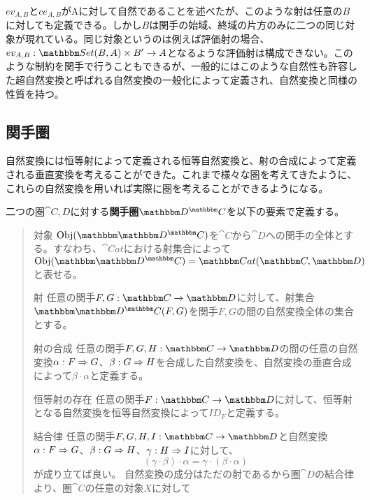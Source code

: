   $ev_{A,B}$と$ce_{A,B}$がAに対して自然であることを述べたが、このような射は任意の$B$に対しても定義できる。しかし$B$は関手の始域、終域の片方のみに二つの同じ対象が現れている。同じ対象というのは例えば評価射の場合、$\mor{ev_{A,B}}{\arset{Set}{B}{A}\times B'}{A}$となるような評価射は構成できない。このような制約を関手で行うこともできるが、一般的にはこのような自然性も許容した超自然変換と呼ばれる自然変換の一般化によって定義され、自然変換と同様の性質を持つ。
	\subsection{関手圏}
	自然変換には恒等射によって定義される恒等自然変換と、射の合成によって定義される垂直変換を考えることができた。これまで様々な圏を考えてきたように、これらの自然変換を用いれば実際に圏を考えることができるようになる。
	\begin{define}[関手圏]
		二つの圏$\cat{C,D}$に対する\textbf{関手圏}$\funccat{C}{D}$を以下の要素で定義する。
		\begin{quote}
			\begin{mydescription}
				\item[対象] $\obj{\funccat{C}{D}}$を$\cat{C}$から$\cat{D}$への関手の全体とする。すなわち、$\cat{Cat}$における射集合によって$\obj{\funccat{C}{D}}=\arset{Cat}{\cat{C}}{\cat{D}}$と表せる。
				\item[射]任意の関手$\functor{F,G}{C}{D}$に対して、射集合$\arset{\funccat{C}{D}}{F}{G}$を関手$F,G$の間の自然変換全体の集合とする。
				\item[射の合成] 任意の関手$\functor{F,G,H}{C}{D}$の間の任意の自然変換$\alpha:F\Rightarrow G$、$\beta:G\Rightarrow H$を合成した自然変換を、自然変換の垂直合成によって$\beta\cdot\alpha$と定義する。
				\item[恒等射の存在]任意の関手$\functor{F}{C}{D}$に対して、恒等射となる自然変換を恒等自然変換によって$ID_F$と定義する。
				\item[結合律]任意の関手$\functor{F,G,H,I}{C}{D}$と自然変換$\alpha:F\Rightarrow G$、$\beta:G\Rightarrow H$、$\gamma:H\Rightarrow I$に対して、\[(\gamma\cdot\beta)\cdot\alpha=\gamma\cdot(\beta\cdot\alpha)\]が成り立てば良い。
				自然変換の成分はただの射であるから圏$\cat{D}$の結合律より、圏$\cat{C}$の任意の対象$X$に対して


\end{mydescription}
\end{quote}
\end{define}
